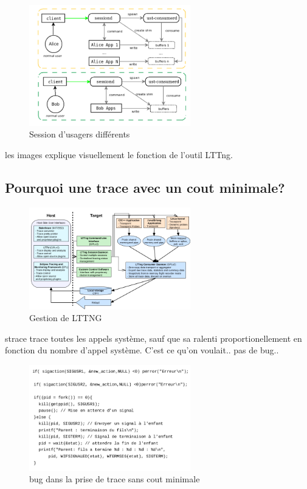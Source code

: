 \documentclass[oneside]{book}
\begin{document}
\begin{figure}[!ht]
\centering
\includegraphics[width = 7cm]{session_usager_different.png}
\caption{Session d'usagers différents}
\end{figure}



les images explique visuellement le fonction de l'outil LTTng.\\

\subsection{Pourquoi une trace avec un cout minimale?}
\begin{figure}
\centering
\includegraphics[width = 7cm]{low_overhead.png}
\caption{Gestion de LTTNG}
\end{figure}

strace trace toutes les appels système, sauf que sa ralenti proportionellement en fonction du nombre d'appel système. C'est ce qu'on voulait.. pas de bug.. \\

\begin{figure}[!ht]
\centering
\includegraphics[width = 7cm]{strace_code.png}
\caption{bug dans la prise de trace sans cout minimale}
\end{figure}
\end{document}
